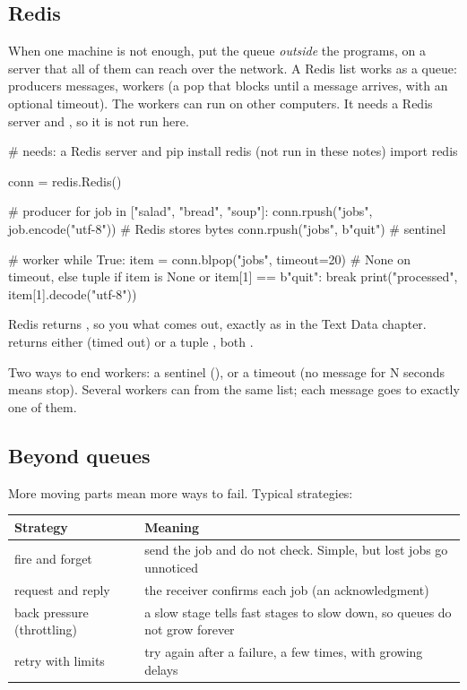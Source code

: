 \subsection{Redis}

When one machine is not enough, put the queue \emph{outside} the programs, on a server that all
of them can reach over the network. A Redis list works as a queue: producers  messages,
workers  (a pop that blocks until a message arrives, with an optional timeout). The
workers can run on other computers. It needs a Redis server and , so it
is not run here.

\begin{pycode}
# needs: a Redis server and  pip install redis   (not run in these notes)
import redis

conn = redis.Redis()

# producer
for job in ["salad", "bread", "soup"]:
    conn.rpush("jobs", job.encode("utf-8"))   # Redis stores bytes
conn.rpush("jobs", b"quit")                     # sentinel

# worker
while True:
    item = conn.blpop("jobs", timeout=20)   # None on timeout, else tuple
    if item is None or item[1] == b"quit":
        break
    print("processed", item[1].decode("utf-8"))
\end{pycode}

\begin{typecheck}
Redis returns , so you  what comes out, exactly as in the Text
Data chapter.  returns either  (timed out) or a tuple
, both .
\end{typecheck}

Two ways to end workers: a sentinel (), or a timeout (no message for N seconds means
stop). Several workers can  from the same list; each message goes to exactly one of
them.

\subsection{Beyond queues}

More moving parts mean more ways to fail. Typical strategies:

\begin{center}
\begin{tabularx}{\linewidth}{@{}l X@{}}
\toprule
\textbf{Strategy} & \textbf{Meaning} \\
\midrule
fire and forget & send the job and do not check. Simple, but lost jobs go unnoticed \\
request and reply & the receiver confirms each job (an acknowledgment) \\
back pressure (throttling) & a slow stage tells fast stages to slow down, so queues do not grow forever \\
retry with limits & try again after a failure, a few times, with growing delays \\
\bottomrule
\end{tabularx}
\end{center}

